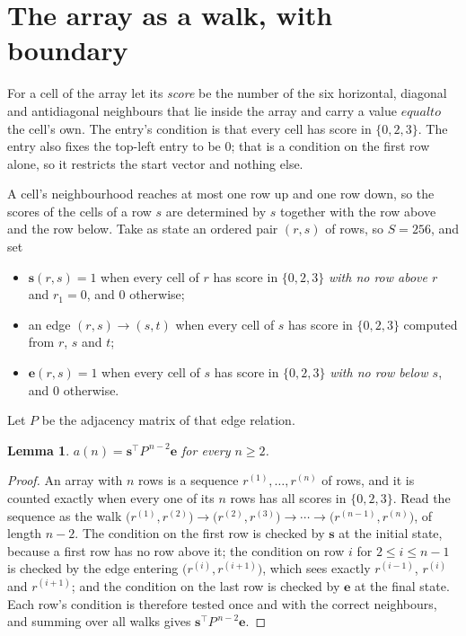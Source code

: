 \documentclass[11pt,a4paper]{article}
\theoremstyle{plain}
\newtheorem{lemma}[theorem]{Lemma}
\theoremstyle{definition}
\begin{document}
\section{The array as a walk, with boundary}

For a cell of the array let its \emph{score} be the number of the six horizontal, diagonal and antidiagonal neighbours that lie inside
the array and carry a value $equal to$ the cell's own. The entry's condition is that every cell
has score in $\{0,2,3\}$. The entry also fixes the top-left entry to be $0$; that is a condition on the first row alone, so it restricts the start vector and nothing else.

A cell's neighbourhood reaches at most one row up and one row down, so the scores of the
cells of a row $s$ are determined by $s$ together with the row above and the row below.
Take as state an ordered pair $(r,s)$ of rows, so $S=256$, and set
\begin{itemize}
\item $\mathbf{s}(r,s)=1$ when every cell of $r$ has score in $\{0,2,3\}$ \emph{with no row
above $r$} and $r_1=0$, and $0$ otherwise;
\item an edge $(r,s)\to(s,t)$ when every cell of $s$ has score in $\{0,2,3\}$ computed from
$r$, $s$ and $t$;
\item $\mathbf{e}(r,s)=1$ when every cell of $s$ has score in $\{0,2,3\}$ \emph{with no row
below $s$}, and $0$ otherwise.
\end{itemize}
Let $P$ be the adjacency matrix of that edge relation.

\begin{lemma}\label{lem:walk}
$a(n)=\mathbf{s}^{\!\top}P^{\,n-2}\mathbf{e}$ for every $n\ge2$.
\end{lemma}

\begin{proof}
An array with $n$ rows is a sequence $r^{(1)},\dots,r^{(n)}$ of rows, and it is counted
exactly when every one of its $n$ rows has all scores in $\{0,2,3\}$. Read the sequence as the
walk $\bigl(r^{(1)},r^{(2)}\bigr)\to\bigl(r^{(2)},r^{(3)}\bigr)\to\cdots\to
\bigl(r^{(n-1)},r^{(n)}\bigr)$, of length $n-2$. The condition on the first row is
checked by $\mathbf{s}$ at the initial state, because a first row has no row above it; the
condition on row $i$ for $2\le i\le n-1$ is checked by the edge entering
$\bigl(r^{(i)},r^{(i+1)}\bigr)$, which sees exactly $r^{(i-1)}$, $r^{(i)}$ and
$r^{(i+1)}$; and the condition on the last row is checked by $\mathbf{e}$ at the final
state. Each row's condition is therefore tested once and with the correct neighbours, and
summing over all walks gives $\mathbf{s}^{\!\top}P^{\,n-2}\mathbf{e}$.
\end{proof}
\end{document}
